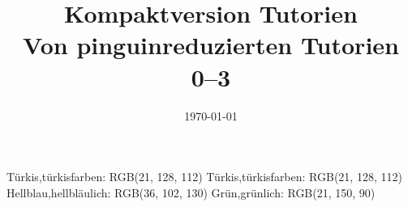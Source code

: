 \def\thpath{./data}
\RequirePackage{color-palettes}
{Türkis,türkisfarben: RGB(21, 128, 112)}
{Türkis,türkisfarben: RGB(21, 128, 112)}
{Hellblau,hellbläulich: RGB(36, 102, 130)}
{Grün,grünlich: RGB(21, 150, 90)}
\def\btdmopts{color=paletteA}%
\def\btdmmode{lightmode-fill}

\usepackage{fmtcount}

%
%
\fullfalse
\def\maxtut{3}
\titlenumber{0--\maxtut}
\title[Alle Tutorien 0--\maxtut]{Kompaktversion Tutorien\\\small Von pinguinreduzierten Tutorien 0--\maxtut}
\date{\sffamily\today}


\let\oldinputif\InputIfFileExists

\makeatletter
\usepackage{pgfcalendar}
\edef\semesterstartyear{2022}
\def\startkwofsemester{16} %
\newcount\@kwconverter
\newcount\@firstweekday
{}
\def\getstartdayofweek#1#2{%
      \ifnum#1<\startkwofsemester \edef\@year{\the\numexpr\semesterstartyear+1}%
      \else\let\@year\semesterstartyear\fi
      \pgfcalendardatetojulian{\@year-1-1}{\@kwconverter}\pgfcalendarjuliantoweekday\@kwconverter\@firstweekday
            \edef\@day{\the\numexpr#1*7-\number\@firstweekday+#2\relax}%
      \pgfcalendardatetojulian{\@year-1-1+\@day}{\@kwconverter}%
      \pgfcalendarjuliantodate{\@kwconverter}\@year\@month\@day
      \DTMdisplaydate\@year\@month\@day\m@ne\relax
}

\def\getKwRange#1{\getstartdayofweek{#1}0\,---\,\getstartdayofweek{#1}6}

